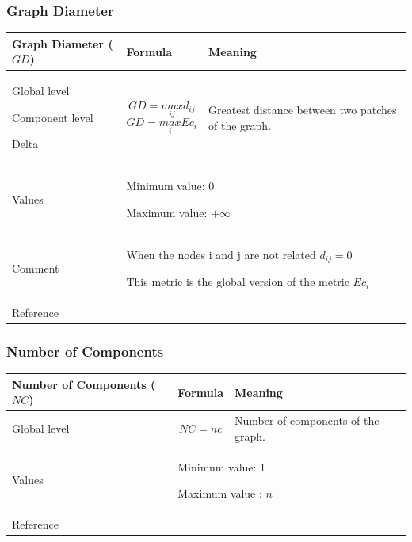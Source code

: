 \documentclass{article}
\begin{document}
\subsubsection{Graph Diameter}
\label{metric_GD}
\begin{table}[H]
\begin{tabular}{|m{3.24cm}|m{4.4810004cm}m{7.924cm}|}
\hline
Graph Diameter ($GD$) &
\multicolumn{1}{m{4.4810004cm}|}{Formula} &
Meaning\\\hline
Global level

Component level 

Delta &
\multicolumn{1}{m{4.4810004cm}|}{\begin{equation*}
\mathit{GD}=\underset{\mathit{ij}}{\mathit{max}}{d}_{\mathit{ij}}
\end{equation*}
\begin{equation*}
\mathit{GD}=\underset{i}{\mathit{max}}{\mathit{Ec}}_{i}
\end{equation*}
} &
Greatest distance between two patches of the graph. \\\hline
Values &
\multicolumn{2}{m{12.6050005cm}|}{Minimum value: 0

Maximum value:  $+{\infty}$

}\\\hline
Comment &
\multicolumn{2}{m{12.6050005cm}|}{When the nodes i and j are not related
 ${d}_{\mathit{ij}}=0$

This metric is the global version of the metric  ${\mathit{Ec}}_{i}$

}\\\hline
Reference &
\multicolumn{2}{m{12.6050005cm}|}{\cite{Urban2001}
}\\\hline
\end{tabular}
\end{table}


\subsubsection{Number of Components}
\label{metric_NC}
\begin{table}[H]
\begin{tabular}{|m{3.24cm}|m{4.4810004cm}m{7.924cm}|}
\hline
Number of Components ($NC$) &
\multicolumn{1}{m{4.4810004cm}|}{Formula} &
Meaning\\\hline
Global  level

 &
\multicolumn{1}{m{4.4810004cm}|}{\begin{equation*}
\mathit{NC}=\mathit{nc}
\end{equation*}
} &
Number of components of the graph.\\\hline
Values &
\multicolumn{2}{m{12.6050005cm}|}{Minimum value: 1

Maximum value :  $n$

}\\\hline
Reference &
\multicolumn{2}{m{12.6050005cm}|}{\cite{Urban2001}
}\\\hline
\end{tabular}
\end{table}
\end{document}
